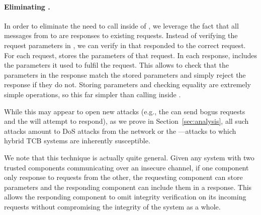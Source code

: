 \paragraph{Eliminating \oauth.}
In order to eliminate the need to call \oauth inside of \tcboff, we leverage the fact that all messages from \tcboff to \tcbon are responses to existing requests.
Instead of verifying the request parameters in \tcboff, we can verify in \tcbon that \tcboff responded to the correct request.
For each request, \tcbon stores the parameters of that request.
In each response, \tcboff includes the parameters it used to fulfil the request.
This allows \tcbon to check that the parameters in the response match the stored parameters
and simply reject the response if they do not.
Storing parameters and checking equality are extremely simple operations, so this far simpler than calling \oauth inside \tcboff.

While this may appear to open new attacks (e.g., the \medname can send bogus requests and the \tcboff will attempt to respond),
as we prove in Section~\ref{sec:analysis}, all such attacks amount to DoS attacks from the network or the \medname---attacks to which hybrid TCB systems are inherently susceptible.

We note that this technique is actually quite general.  Given any system with
two trusted components communicating over an insecure channel, if one component
only response to requests from the other, the requesting component can store
parameters and the responding component can include them in a response.  This
allows the responding component to omit integrity verification on its incoming
requests without compromising the integrity of the system as a whole.

